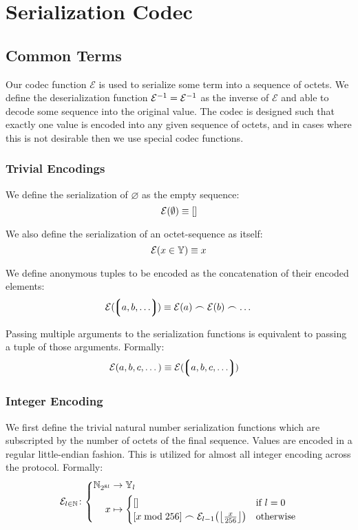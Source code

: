 \section{Serialization Codec}\label{sec:serialization}

\subsection{Common Terms}

Our codec function $\mathcal{E}$ is used to serialize some term into a sequence of octets. We define the deserialization function $\mathcal{E}^{-1} = \mathcal{E}^{-1}$ as the inverse of $\mathcal{E}$ and able to decode some sequence into the original value. The codec is designed such that exactly one value is encoded into any given sequence of octets, and in cases where this is not desirable then we use special codec functions.

\subsubsection{Trivial Encodings}
We define the serialization of $\varnothing$ as the empty sequence:
\begin{equation}
  \mathcal{E}(\emptyset) \equiv []
\end{equation}

We also define the serialization of an octet-sequence as itself:
\begin{equation}
  \mathcal{E}(x \in \mathbb{Y}) \equiv x
\end{equation}

We define anonymous tuples to be encoded as the concatenation of their encoded elements:
\begin{equation}
  \se(\tup{a, b, \dots}) \equiv \se(a) \concat \se(b) \concat \dots
\end{equation}

Passing multiple arguments to the serialization functions is equivalent to passing a tuple of those arguments. Formally:
\begin{align}
  \se(a, b, c, \dots) &\equiv \se(\tup{a, b, c, \dots})
\end{align}

\subsubsection{Integer Encoding}
We first define the trivial natural number serialization functions which are subscripted by the number of octets of the final sequence. Values are encoded in a regular little-endian fashion. This is utilized for almost all integer encoding across the protocol. Formally:
\begin{equation}
  \se_{l \in \N}\colon\left\{\begin{aligned}
    \N_{2^{8l}} &\to \Y_l \\
    x &\mapsto \begin{cases}
      [] &\when l = 0 \\
      [x \bmod 256] \concat \se_{l - 1}\left(\left\lfloor \frac{x}{256} \right\rfloor\right) &\otherwise
    \end{cases}
  \end{aligned}\right.
\end{equation}

